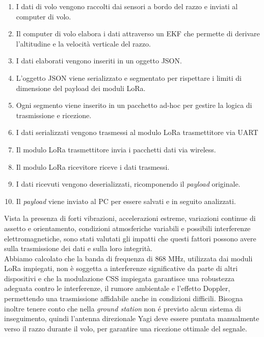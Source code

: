 \documentclass[12pt,a4paper,twoside]{book}
\begin{document}
\begin{enumerate}
    \item I dati di volo vengono raccolti dai sensori a bordo del razzo e inviati al computer di volo.
    \item Il computer di volo elabora i dati attraverso un \ac{EKF} che permette di derivare l'altitudine e la velocità verticale del razzo.
    \item I dati elaborati vengono inseriti in un oggetto JSON.
    \item L'oggetto JSON viene serializzato e segmentato per rispettare i limiti di dimensione del payload dei moduli \ac{LoRa}.
    \item Ogni segmento viene inserito in un pacchetto ad-hoc per gestire la logica di trasmissione e ricezione.
    \item I dati serializzati vengono trasmessi al modulo \ac{LoRa} trasmettitore via \ac{UART}
    \item Il modulo \ac{LoRa} trasmettitore invia i pacchetti dati via wireless.
    \item Il modulo \ac{LoRa} ricevitore riceve i dati trasmessi.
    \item I dati ricevuti vengono deserializzati, ricomponendo il \emph{payload} originale.
    \item Il \emph{payload} viene inviato al PC per essere salvati e in seguito analizzati.
\end{enumerate}
Vista la presenza di forti vibrazioni, accelerazioni estreme,
variazioni continue di assetto e orientamento, condizioni atmosferiche variabili
e possibili interferenze elettromagnetiche, sono stati valutati
gli impatti che questi fattori possono avere sulla trasmissione dei dati e sulla
loro integrità. \\
Abbiamo calcolato che la banda di frequenza di 868 MHz, utilizzata dai moduli
\ac{LoRa} impiegati, non è soggetta a interferenze significative da parte di altri
dispositivi e che la modulazione \ac{CSS} impiegata garantisce una robustezza
adeguata contro le interferenze, il rumore ambientale e l'effetto Doppler,
permettendo una trasmissione affidabile anche in condizioni difficili.
Bisogna inoltre tenere conto che nella \emph{ground station} non \'e previsto
alcun sistema di inseguimento, quindi l'antenna direzionale Yagi deve essere puntata manualmente
verso il razzo durante il volo, per garantire una ricezione ottimale del segnale.
\end{document}
